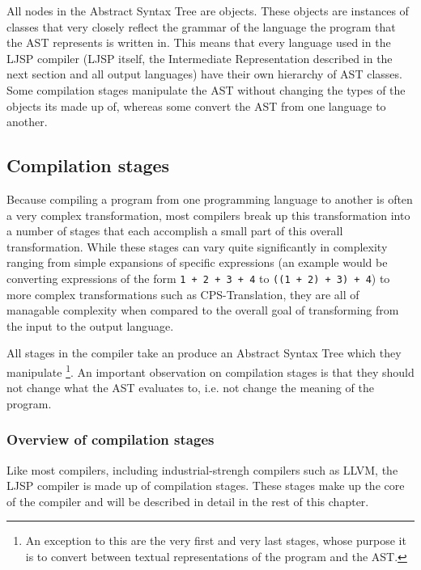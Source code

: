 \documentclass[11pt]{report}
\begin{document}
All nodes in the Abstract Syntax Tree are objects. These objects are instances of classes that very closely reflect the grammar of the language the program that the AST represents is written in. This means that every language used in the LJSP compiler (LJSP itself, the Intermediate Representation described in the next section and all output languages) have their own hierarchy of AST classes. Some compilation stages manipulate the AST without changing the types of the objects its made up of, whereas some convert the AST from one language to another. 


\subsection{Compilation stages}
Because compiling a program from one programming language to another is often a very complex transformation, most compilers break up this transformation into a number of stages that each accomplish a small part of this overall transformation. While these stages can vary quite significantly in complexity ranging from simple expansions of specific expressions (an example would be converting expressions of the form \hbox{\texttt{1 + 2 + 3 + 4}} to \hbox{\texttt{((1 + 2) + 3) + 4}}) to more complex transformations such as CPS-Translation, they are all of managable complexity when compared to the overall goal of transforming from the input to the output language.

All stages in the compiler take an produce an Abstract Syntax Tree which they manipulate \footnote{An exception to this are the very first and very last stages, whose purpose it is to convert between textual representations of the program and the AST.}. An important observation on compilation stages is that they should not change what the AST evaluates to, i.e. not change the meaning of the program.

\subsubsection{Overview of compilation stages}
Like most compilers, including industrial-strengh compilers such as LLVM, the LJSP compiler is made up of compilation stages. These stages make up the core of the compiler and will be described in detail in the rest of this chapter.
\end{document}
